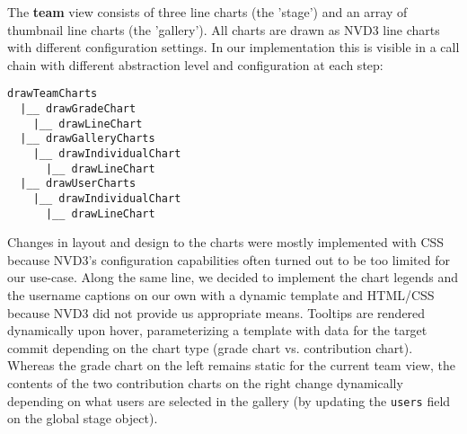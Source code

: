 \documentclass[../manifest.tex]{subfiles}
\begin{document}
The \textbf{team} view consists of three line charts (the 'stage') and an array of thumbnail line charts (the 'gallery'). All charts are drawn as NVD3 line charts with different configuration settings. In our implementation this is visible in a call chain with different abstraction level and configuration at each step:
\begin{verbatim}
drawTeamCharts
  |__ drawGradeChart
    |__ drawLineChart
  |__ drawGalleryCharts
    |__ drawIndividualChart
      |__ drawLineChart
  |__ drawUserCharts
    |__ drawIndividualChart
      |__ drawLineChart
\end{verbatim}

Changes in layout and design to the charts were mostly implemented with CSS because NVD3's configuration capabilities often turned out to be too limited for our use-case. Along the same line, we decided to implement the chart legends and the username captions on our own with a dynamic template and HTML/CSS because NVD3 did not provide us appropriate means. Tooltips are rendered dynamically upon hover, parameterizing a template with data for the target commit depending on the chart type (grade chart vs. contribution chart). Whereas the grade chart on the left remains static for the current team view, the contents of the two contribution charts on the right change dynamically depending on what users are selected in the gallery (by updating the \texttt{users} field on the global stage object).
\end{document}
